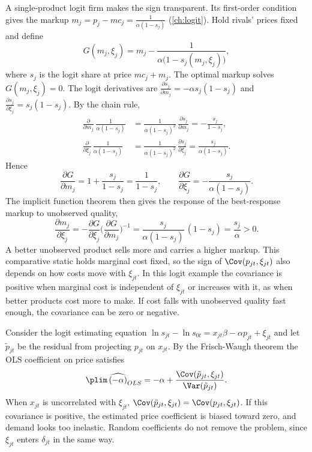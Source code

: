 A single-product logit firm makes the sign transparent. Its first-order condition gives the markup $m_j =
p_j - mc_j = \frac{1}{\alpha(1 - s_j)}$ (\cref{ch:logit}). Hold rivals' prices fixed and define
\begin{equation*}
  G(m_j, \xi_j) = m_j - \frac{1}{\alpha\big(1 - s_j(m_j, \xi_j)\big)},
\end{equation*}
where $s_j$ is the logit share at price $mc_j + m_j$. The optimal markup solves $G(m_j, \xi_j) = 0$. The logit
derivatives are $\frac{\partial s_j}{\partial m_j} = -\alpha s_j(1 - s_j)$ and $\frac{\partial s_j}{\partial
\xi_j} = s_j(1 - s_j)$. By the chain rule,
\begin{align*}
  \frac{\partial}{\partial m_j}\,\frac{1}{\alpha(1 - s_j)} &= \frac{1}{\alpha(1 - s_j)^2}\,\frac{\partial
  s_j}{\partial m_j} = -\frac{s_j}{1 - s_j},\\
  \frac{\partial}{\partial \xi_j}\,\frac{1}{\alpha(1 - s_j)} &= \frac{1}{\alpha(1 - s_j)^2}\,\frac{\partial
  s_j}{\partial \xi_j} = \frac{s_j}{\alpha(1 - s_j)}.
\end{align*}
Hence
\begin{equation*}
  \frac{\partial G}{\partial m_j} = 1 + \frac{s_j}{1 - s_j} = \frac{1}{1 - s_j}, \qquad
  \frac{\partial G}{\partial \xi_j} = -\frac{s_j}{\alpha(1 - s_j)}.
\end{equation*}
The implicit function theorem then gives the response of the best-response markup to unobserved quality,
\begin{equation*}
  \frac{\partial m_j}{\partial \xi_j} = -\frac{\partial G}{\partial \xi_j}\Big(\frac{\partial G}{\partial
  m_j}\Big)^{-1} = \frac{s_j}{\alpha(1 - s_j)}\,(1 - s_j) = \frac{s_j}{\alpha} > 0.
\end{equation*}
A better unobserved product sells more and carries a higher markup. This comparative static holds marginal cost
fixed, so the sign of $\Cov(p_{jt}, \xi_{jt})$ also depends on how costs move with $\xi_{jt}$. In this logit
example the covariance is positive when marginal cost is independent of $\xi_{jt}$ or increases with it, as when
better products cost more to make. If cost falls with unobserved quality fast enough, the covariance can be zero or negative.

Consider the logit estimating equation $\ln s_{jt} - \ln s_{0t} = x_{jt}\beta - \alpha p_{jt} + \xi_{jt}$
and let $\tilde p_{jt}$ be the residual from projecting $p_{jt}$ on $x_{jt}$. By the Frisch-Waugh theorem the
OLS coefficient on price satisfies
\begin{equation*}
  \plim\, \widehat{(-\alpha)}_{OLS} = -\alpha + \frac{\Cov(\tilde p_{jt}, \xi_{jt})}{\Var(\tilde p_{jt})}.
\end{equation*}
When $x_{jt}$ is uncorrelated with $\xi_{jt}$, $\Cov(\tilde p_{jt}, \xi_{jt}) = \Cov(p_{jt}, \xi_{jt})$. If this
covariance is positive, the estimated price coefficient is biased toward zero, and demand looks too inelastic.
Random coefficients do not remove the problem, since $\xi_{jt}$ enters $\delta_{jt}$ in the same way.

